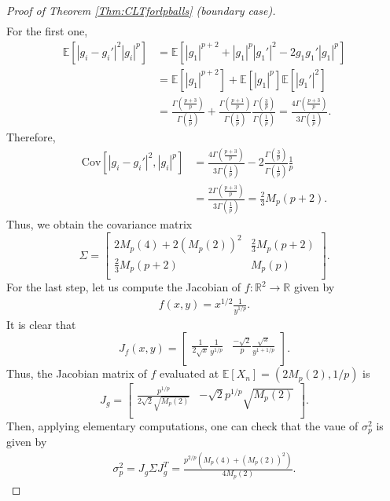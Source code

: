 \documentclass[10pt,a4paper]{amsart}
\def\E{\mathbb{E}}
\def\R{\mathbb{R}}
\def\cov{\text{Cov}}
\begin{document}
\begin{proof}[Proof of Theorem \ref{Thm:CLTforlpballs} (boundary case)]
\begin{align*}
\end{align*}
For the first one,
\begin{align*}
\E [ \left| g_i - g_i'\right|^2  \left| g_i \right|^p] & = \E[ |g_1|^{p+2} + |g_1|^p|g_1'|^2 - 2g_1 g_1' |g_1|^p ]
 \\
  & =  \E[ |g_1|^{p+2}] +  \E[ |g_1|^{p}]  \E[ |g_1'|^{2}]
 \\
  & = \frac{\Gamma \left( \frac{p+3}{p} \right)}{\Gamma \left( \frac{1}{p} \right)} + \frac{\Gamma \left( \frac{p+1}{p} \right)}{\Gamma \left( \frac{1}{p} \right)} \frac{\Gamma \left( \frac{3}{p} \right)}{\Gamma \left( \frac{1}{p} \right)} = \frac{4\Gamma \left( \frac{p+3}{p} \right)}{3\Gamma \left( \frac{1}{p} \right)} .
\end{align*}
Therefore,
\begin{align*}
\cov[\left| g_i - g_i'\right|^2 , \left| g_i\right|^p ] & = \frac{4\Gamma \left( \frac{p+3}{p} \right)}{3\Gamma \left( \frac{1}{p} \right)} - 2 \frac{\Gamma \left( \frac{3}{p} \right)}{\Gamma \left( \frac{1}{p} \right)} \frac{1}{p}
 \\
 & = \frac{2 \Gamma \left( \frac{p+3}{p} \right)}{3\Gamma \left( \frac{1}{p} \right)} = \frac{2}{3} M_{p} (p+2).
\end{align*}
Thus, we obtain the covariance matrix
\[
   \Sigma = 
  \left[ {\begin{array}{cc}
   2 M_p(4) + 2 (M_p(2))^2 & \frac{2}{3} M_{p} (p+2) \\
   \frac{2}{3} M_{p} (p+2)  &  M_p(p) \\
  \end{array} } \right].
\]
For the last step, let us compute the Jacobian of $f: \R^2 \to \R$ given by
\begin{align*}
f(x,y) =  x^{1/2} \frac{1}{y^{1/p}}  .
\end{align*} 
It is clear that 
\[
   J_f (x,y) = 
  \left[ {\begin{array}{cc}
   \frac{1}{2\sqrt{x}} \frac{1}{y^{1/p}}  & \frac{-\sqrt{2}}{p} \frac{\sqrt{x}}{y^{1+ 1/p}}  \\
  \end{array} } \right] .
\]
Thus, the Jacobian matrix of $f$ evaluated at $\E[X_n] = \left( 2 M_p(2) , 1/p \right)$ is
\[
   J_g = 
  \left[ {\begin{array}{cc}
   \frac{p^{1/p} }{2 \sqrt{2} \sqrt{M_p(2)}}  & - \sqrt{2}  p^{1/p} \sqrt{M_p(2)} \\
  \end{array} } \right] .
\]
Then, applying elementary computations, one can check that the vaue of $\sigma_p ^2$ is given by
\begin{align*}
\sigma_p ^2 = J_g \Sigma J_g ^T = \frac{p^{2/p} \left( M_p(4) + (M_p(2))^2 \right)}{4 M_p(2)}.
\end{align*}
\end{proof}
\end{document}
